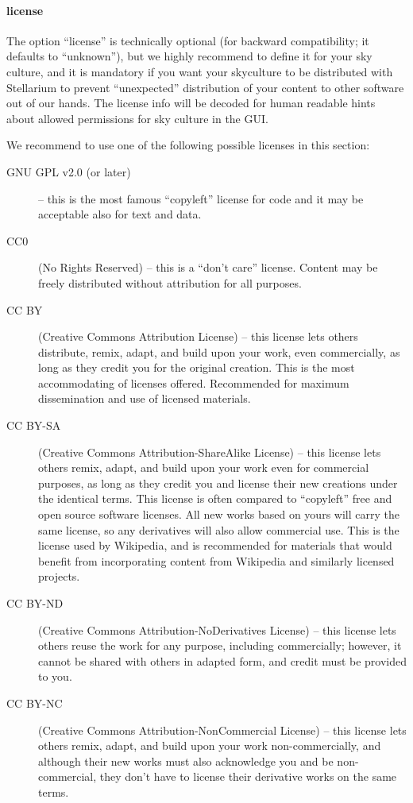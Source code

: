 \paragraph{license}
The option ``license''  is technically optional
(for backward compatibility; it defaults to ``unknown''), but we
highly recommend to define it for your sky culture, and it is
mandatory if you want your skyculture to be distributed with
Stellarium to prevent ``unexpected'' distribution of your content to other
software out of our hands.  The license info will be decoded for human
readable hints about allowed permissions for sky culture in the GUI.

We recommend to use one of the following possible licenses in this section: 
\begin{description}
  \item[GNU GPL v2.0 (or later)] -- this is the most famous ``copyleft'' license for code and it may be acceptable also for text and data.
  \item[CC0] (No Rights Reserved) -- this is a ``don't care'' license. Content may be freely distributed without attribution for all purposes. 
  \item[CC BY] (Creative Commons Attribution License) -- this license lets others distribute, remix, adapt, and build upon your work, even commercially, as long as they credit you for the original creation.
    This is the most accommodating of licenses offered. Recommended for maximum dissemination and use of licensed materials.
  \item[CC BY-SA] (Creative Commons Attribution-ShareAlike License) -- this license lets others remix, adapt, and build upon your work even for commercial purposes, as long as they credit you and license their new creations under the identical terms.
    This license is often compared to ``copyleft'' free and open source software licenses. All new works based on yours will carry the same license, so any derivatives will also allow commercial use.
    This is the license used by Wikipedia, and is recommended for materials that would benefit from incorporating content from Wikipedia and similarly licensed projects.
  \item[CC BY-ND] (Creative Commons Attribution-NoDerivatives License) -- this license lets others reuse the work for any purpose, including commercially; however, it cannot be shared with others in adapted form, and credit must be provided to you.
  \item[CC BY-NC] (Creative Commons Attribution-NonCommercial License) -- this license lets others remix, adapt, and build upon your work non-commercially, and although their new works must also acknowledge you and be non-commercial, they don’t have to license their derivative works on the same terms.

\end{description}
